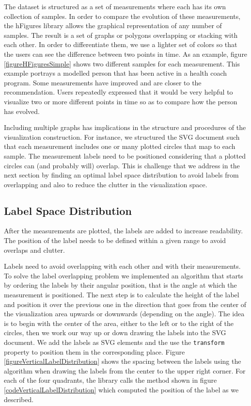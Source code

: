 \documentclass[twocolumn]{bmcart}%
\begin{document}
The dataset is structured as a set of measurements where each has its own collection of samples. In order to compare the evolution of these measurements, the hFigures library allows the graphical representation of any number of samples. The result is a set of graphs or polygons overlapping or stacking with each other. In order to differentiate them, we use a lighter set of colors so that the users can see the difference between two points in time. As an example, figure \ref{figureHFiguresSimple} shows two different samples for each measurement. This example portrays a modelled person that has been active in a health coach program. Some measurements have improved and are closer to the recommendation. Users repeatedly expressed that it would be very helpful to visualize two or more different points in time so as to compare how the person has evolved. 

Including multiple graphs has implications in the structure and procedures of the visualization construction. For instance, we structured the SVG document such that each measurement includes one or many plotted circles that map to each sample. The measurement labels need to be positioned considering that a plotted circles can (and probably will) overlap. This is challenge that we address in the next section by finding an optimal label space distribution to avoid labels from overlapping and also to reduce the clutter in the visualization space.

\subsection*{Label Space Distribution}

After the measurements are plotted, the labels are added to increase readability. The position of the label needs to be defined within a given range to avoid overlaps and clutter.


Labels need to avoid overlapping with each other and with their measurements. To solve the label overlapping problem we implemented an algorithm that starts by ordering the labels by their angular position, that is the angle at which the measurement is positioned. The next step is to calculate the height of the label and position it over the previous one in the direction that goes from the center of the visualization area upwards or downwards (depending on the angle). The idea is to begin with the center of the area, either to the left or to the right of the circles, then we work our way up or down drawing the labels into the SVG document. We add the labels as SVG elements and the use the \texttt{transform} property to position them in the corresponding place. Figure \ref{figureVerticalLabelDistribution} shows the spacing between the labels using the algorithm when drawing the labels from the center to the upper right corner. For each of the four quadrants, the library calls the method shown in figure \ref{codeVerticalLabelDistribution} which computed the position of the label as we described.
\end{document}
